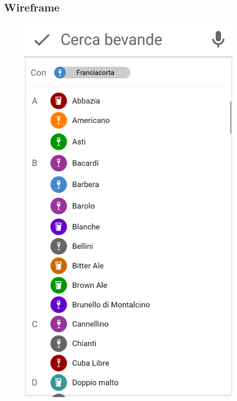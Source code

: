 \subsection{Wireframe}
\begin{figure}[H]
	\begin{minipage}{.49\textwidth}
		\includegraphics[width=\textwidth]{img/wireframe/aggiungi_bevanda_aggiunta.png}
	\end{minipage}
	\begin{minipage}{.49\textwidth}

\end{minipage}
\end{figure}
